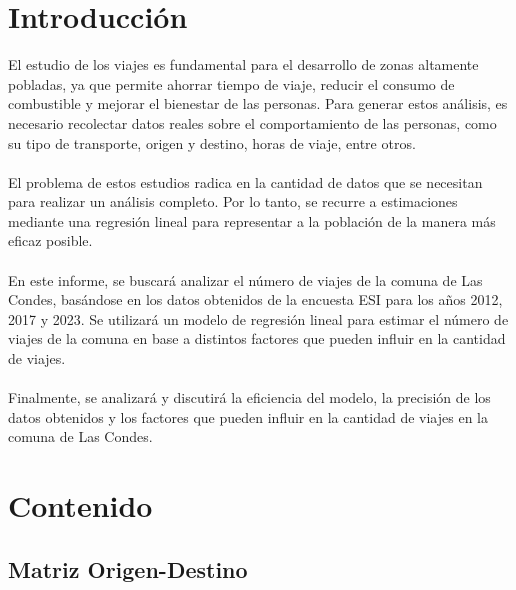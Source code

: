 \documentclass[12pt]{article} %
\begin{document}
\setcounter{page}{1} %

\section{Introducción}

El estudio de los viajes es fundamental para el desarrollo de zonas altamente pobladas, ya que permite ahorrar tiempo de viaje, reducir el consumo de combustible y mejorar el bienestar de las personas. Para generar estos análisis, es necesario recolectar datos reales sobre el comportamiento de las personas, como su tipo de transporte, origen y destino, horas de viaje, entre otros.
\\ \\
El problema de estos estudios radica en la cantidad de datos que se necesitan para realizar un análisis completo. Por lo tanto, se recurre a estimaciones mediante una regresión lineal para representar a la población de la manera más eficaz posible.
\\ \\
En este informe, se buscará analizar el número de viajes de la comuna de Las Condes, basándose en los datos obtenidos de la encuesta ESI para los años 2012, 2017 y 2023. Se utilizará un modelo de regresión lineal para estimar el número de viajes de la comuna en base a distintos factores que pueden influir en la cantidad de viajes.
\\ \\
Finalmente, se analizará y discutirá la eficiencia del modelo, la precisión de los datos obtenidos y los factores que pueden influir en la cantidad de viajes en la comuna de Las Condes.

\section{Contenido}

\subsection{Matriz Origen-Destino}
\end{document}
